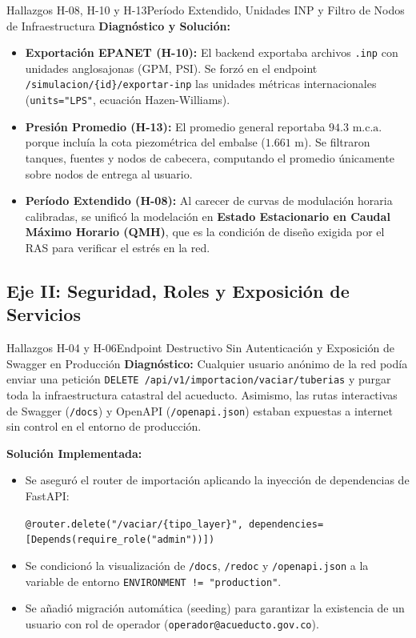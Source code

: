 \documentclass[11pt,letterpaper]{article}
\begin{document}
\begin{hallazgobox}{Hallazgos H-08, H-10 y H-13}{Período Extendido, Unidades INP y Filtro de Nodos de Infraestructura}
\textbf{Diagnóstico y Solución:}
\begin{itemize}
    \item \textbf{Exportación EPANET (H-10):} El backend exportaba archivos \texttt{.inp} con unidades anglosajonas (GPM, PSI). Se forzó en el endpoint \texttt{/simulacion/\{id\}/exportar-inp} las unidades métricas internacionales (\texttt{units="LPS"}, ecuación Hazen-Williams).
    \item \textbf{Presión Promedio (H-13):} El promedio general reportaba $94.3\text{ m.c.a.}$ porque incluía la cota piezométrica del embalse ($1.661\text{ m}$). Se filtraron tanques, fuentes y nodos de cabecera, computando el promedio únicamente sobre nodos de entrega al usuario.
    \item \textbf{Período Extendido (H-08):} Al carecer de curvas de modulación horaria calibradas, se unificó la modelación en \textbf{Estado Estacionario en Caudal Máximo Horario (QMH)}, que es la condición de diseño exigida por el RAS para verificar el estrés en la red.
\end{itemize}
\end{hallazgobox}

\subsection{Eje II: Seguridad, Roles y Exposición de Servicios}

\begin{hallazgobox}{Hallazgos H-04 y H-06}{Endpoint Destructivo Sin Autenticación y Exposición de Swagger en Producción}
\textbf{Diagnóstico:}
Cualquier usuario anónimo de la red podía enviar una petición \texttt{DELETE /api/v1/importacion/vaciar/tuberias} y purgar toda la infraestructura catastral del acueducto. Asimismo, las rutas interactivas de Swagger (\texttt{/docs}) y OpenAPI (\texttt{/openapi.json}) estaban expuestas a internet sin control en el entorno de producción.

\textbf{Solución Implementada:}
\begin{itemize}
    \item Se aseguró el router de importación aplicando la inyección de dependencias de FastAPI:
    \begin{center}
    \texttt{@router.delete("/vaciar/\{tipo\_layer\}", dependencies=[Depends(require\_role("admin"))])}
    \end{center}
    \item Se condicionó la visualización de \texttt{/docs}, \texttt{/redoc} y \texttt{/openapi.json} a la variable de entorno \texttt{ENVIRONMENT != "production"}.
    \item Se añadió migración automática (seeding) para garantizar la existencia de un usuario con rol de operador (\texttt{operador@acueducto.gov.co}).
\end{itemize}
\end{hallazgobox}
\end{document}
